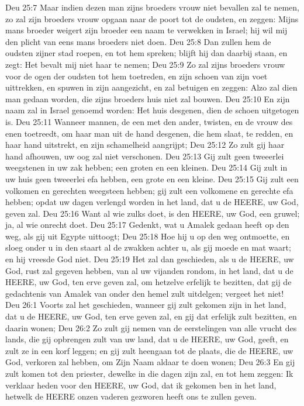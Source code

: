 Deu 25:7  Maar indien dezen man zijns broeders vrouw niet bevallen zal te nemen, zo zal zijn broeders vrouw opgaan naar de poort tot de oudsten, en zeggen: Mijns mans broeder weigert zijn broeder een naam te verwekken in Israel; hij wil mij den plicht van eens mans broeders niet doen.
Deu 25:8  Dan zullen hem de oudsten zijner stad roepen, en tot hem spreken; blijft hij dan daarbij staan, en zegt: Het bevalt mij niet haar te nemen;
Deu 25:9  Zo zal zijns broeders vrouw voor de ogen der oudsten tot hem toetreden, en zijn schoen van zijn voet uittrekken, en spuwen in zijn aangezicht, en zal betuigen en zeggen: Alzo zal dien man gedaan worden, die zijns broeders huis niet zal bouwen.
Deu 25:10  En zijn naam zal in Israel genoemd worden: Het huis desgenen, dien de schoen uitgetogen is.
Deu 25:11  Wanneer mannen, de een met den ander, twisten, en de vrouw des enen toetreedt, om haar man uit de hand desgenen, die hem slaat, te redden, en haar hand uitstrekt, en zijn schamelheid aangrijpt;
Deu 25:12  Zo zult gij haar hand afhouwen, uw oog zal niet verschonen.
Deu 25:13  Gij zult geen tweeerlei weegstenen in uw zak hebben; een groten en een kleinen.
Deu 25:14  Gij zult in uw huis geen tweeerlei efa hebben, een grote en een kleine.
Deu 25:15  Gij zult een volkomen en gerechten weegsteen hebben; gij zult een volkomene en gerechte efa hebben; opdat uw dagen verlengd worden in het land, dat u de HEERE, uw God, geven zal.
Deu 25:16  Want al wie zulks doet, is den HEERE, uw God, een gruwel; ja, al wie onrecht doet.
Deu 25:17  Gedenkt, wat u Amalek gedaan heeft op den weg, als gij uit Egypte uittoogt;
Deu 25:18  Hoe hij u op den weg ontmoette, en sloeg onder u in den staart al de zwakken achter u, als gij moede en mat waart; en hij vreesde God niet.
Deu 25:19  Het zal dan geschieden, als u de HEERE, uw God, rust zal gegeven hebben, van al uw vijanden rondom, in het land, dat u de HEERE, uw God, ten erve geven zal, om hetzelve erfelijk te bezitten, dat gij de gedachtenis van Amalek van onder den hemel zult uitdelgen; vergeet het niet!
Deu 26:1  Voorts zal het geschieden, wanneer gij zult gekomen zijn in het land, dat u de HEERE, uw God, ten erve geven zal, en gij dat erfelijk zult bezitten, en daarin wonen;
Deu 26:2  Zo zult gij nemen van de eerstelingen van alle vrucht des lands, die gij opbrengen zult van uw land, dat u de HEERE, uw God, geeft, en zult ze in een korf leggen; en gij zult heengaan tot de plaats, die de HEERE, uw God, verkoren zal hebben, om Zijn Naam aldaar te doen wonen;
Deu 26:3  En gij zult komen tot den priester, dewelke in die dagen zijn zal, en tot hem zeggen: Ik verklaar heden voor den HEERE, uw God, dat ik gekomen ben in het land, hetwelk de HEERE onzen vaderen gezworen heeft ons te zullen geven.
